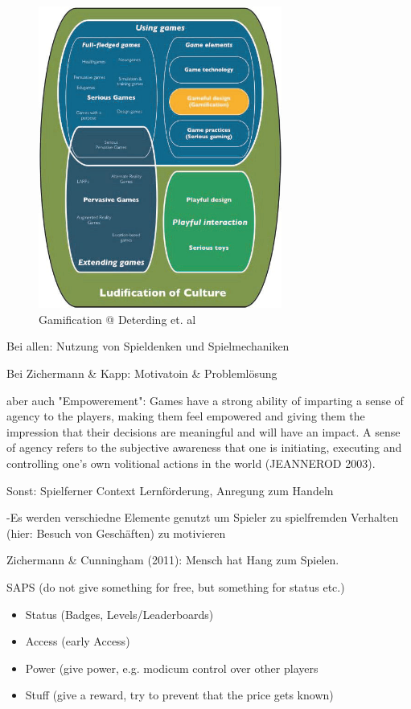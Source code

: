 \begin{figure}[H]
\begin{center}
\includegraphics[width=80mm]{images/ch3_img02_gamification.png}
\caption{Gamification @ Deterding et. al}
\label{img:ch3_img01_LBG_SN_etc}
\end{center}
\end{figure}

Bei allen:
Nutzung von Spieldenken und Spielmechaniken

Bei Zichermann \& Kapp:
Motivatoin \& Problemlösung

aber auch "Empowerement":
Games have a strong ability of imparting a sense of agency to the players, making them feel
empowered and giving them the impression that their decisions are meaningful and will
have an impact. A sense of agency refers to the subjective awareness that one is initiating,
executing and controlling one’s own volitional actions in the world (JEANNEROD 2003).

Sonst:
Spielferner Context
Lernförderung, Anregung zum Handeln

-Es werden verschiedne Elemente genutzt um Spieler zu spielfremden Verhalten (hier: Besuch von Geschäften) zu motivieren


Zichermann \& Cunningham (2011):
Mensch hat Hang zum Spielen.

SAPS (do not give something for free, but something for status etc.)

\begin{itemize}
      \item Status (Badges, Levels/Leaderboards)
      \item Access (early Access)
      \item Power (give power, e.g. modicum control over other players
      \item Stuff (give a reward, try to prevent that the price gets known)
\end{itemize}

